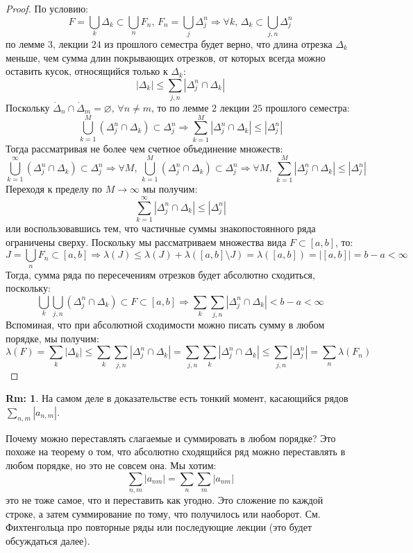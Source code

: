 \documentclass[12pt]{article}
\newcommand{\VN}{\varnothing}
\theoremstyle{definition}
\newtheorem{rem}{Rm:}
\begin{document}
\begin{proof}
	По условию:
	$$
		F = \bigcup\limits_{k} \Delta_k \subset \bigcup\limits_n F_n, \, F_n = \bigcup\limits_{j } \Delta_j^n \Rightarrow \forall k, \, \Delta_k \subset \bigcup\limits_{j,n}\Delta_j^n 
	$$
	по лемме $3$, лекции $24$ из прошлого семестра будет верно, что длина отрезка $\Delta_k$ меньше, чем сумма длин покрывающих отрезков, от которых всегда можно оставить кусок, относящийся только к $\Delta_k$:
	$$
		|\Delta_k| \leq \sum\limits_{j,n}\left|\Delta_j^n \cap \Delta_k\right |
	$$
	Поскольку $\mathring{\Delta}_n \cap \mathring{\Delta}_m = \VN, \, \forall n \neq m$, то по лемме $2$ лекции $25$ прошлого семестра:
	$$
		\bigcup\limits_{k = 1}^{M}(\Delta_j^n \cap \Delta_k ) \subset \Delta_j^n \Rightarrow \sum\limits_{k = 1}^M\left|\Delta_j^n \cap \Delta_k\right | \leq |\Delta_j^n| 
	$$
	Тогда рассматривая не более чем счетное объединение множеств:
	$$
		\bigcup\limits_{k = 1}^{\infty}(\Delta_j^n \cap \Delta_k )  \subset \Delta_j^n \Rightarrow \forall M, \, \bigcup\limits_{k = 1}^{M}(\Delta_j^n \cap \Delta_k )  \subset \Delta_j^n \Rightarrow \forall M,\, \sum\limits_{k = 1}^M\left|\Delta_j^n \cap \Delta_k\right | \leq |\Delta_j^n| 
	$$
	Переходя к пределу по $M \to \infty$ мы получим:
	$$
		\sum\limits_{k = 1}^{\infty}\left|\Delta_j^n \cap \Delta_k\right | \leq |\Delta_j^n|
	$$
	или воспользовавшись тем, что частичные суммы знакопостоянного ряда ограничены сверху. Поскольку мы рассматриваем множества вида $F \subset [a,b]$, то:
	$$
		J = \bigcup\limits_{n} F_n \subset [a,b] \Rightarrow \lambda(J) \leq \lambda(J) +  \lambda([a,b]\setminus J) = \lambda([a,b]) = \left|[a,b]\right| = b-a < \infty
	$$
	Тогда, сумма ряда по пересечениям отрезков будет абсолютно сходиться, поскольку:
	$$
		\bigcup\limits_{k}\bigcup\limits_{j,n} (\Delta_j^n \cap \Delta_k) \subset F \subset [a,b] \Rightarrow \sum\limits_{k}\sum\limits_{j,n}\left|\Delta_j^n \cap \Delta_k\right| < b - a < \infty
	$$
	Вспоминая, что при абсолютной сходимости можно писать сумму в любом порядке, мы получим:
	$$
		\lambda(F) = \sum\limits_{k}|\Delta_k| \leq \sum\limits_{k}\sum\limits_{j,n}\left|\Delta_j^n \cap \Delta_k\right| = \sum\limits_{j,n}\sum\limits_{k}\left|\Delta_j^n \cap \Delta_k\right| \leq \sum\limits_{j,n}|\Delta_j^n| = \sum\limits_{n}\lambda(F_n)
	$$
\end{proof}
\begin{rem}
	На самом деле в доказательстве есть тонкий момент, касающийся рядов $\displaystyle \sum\limits_{n,m}|a_{n,m}|$. 
	
	Почему можно переставлять слагаемые и суммировать в любом порядке? Это похоже на теорему о том, что абсолютно сходящийся ряд можно переставлять в любом порядке, но это не совсем она. Мы хотим:
	$$
		\sum\limits_{n,m}|a_{nm}| = \sum\limits_{n}\sum\limits_{m}|a_{nm}|
	$$
	это не тоже самое, что и переставить как угодно. Это сложение по каждой строке, а затем суммирование по тому, что получилось или наоборот. См. Фихтенгольца про повторные ряды или последующие лекции (это будет обсуждаться далее).
\end{rem}
\end{document}
